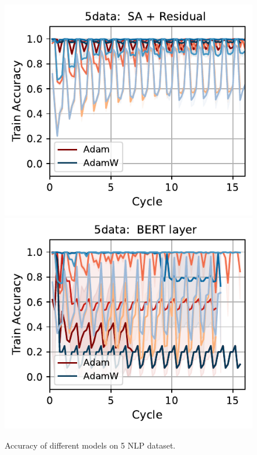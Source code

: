 \begin{figure}[t]
{    \includegraphics[width=\textwidth]{figs/Accuracy/5nlp/attention_residual/5data_40.pdf}
    \includegraphics[width=\textwidth]{figs/Accuracy/5nlp/bert_layer/5data_40.pdf}
    }
    \caption{Accuracy of different models on 5 NLP dataset.}
    \label{fig:5nlp_models}
\end{figure}




